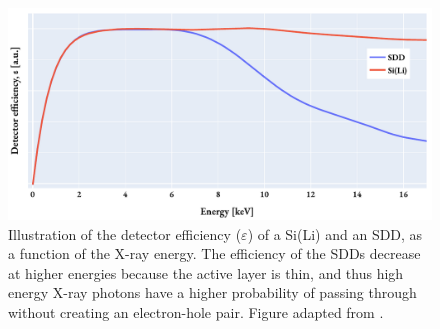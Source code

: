 \begin{figure}[phtb]
    \centering
    \includegraphics[width=0.8\linewidth]{figures/detector_efficiency_illustration.pdf}
    \caption{
        Illustration of the detector efficiency ($\varepsilon$) of a Si(Li) and an SDD, as a function of the X-ray energy.
        The efficiency of the SDDs decrease at higher energies because the active layer is thin, and thus high energy X-ray photons have a higher probability of passing through without creating an electron-hole pair.
        Figure adapted from \cite{liao2006practical}. %
    }
    \label{fig:detector_efficiency}
\end{figure}




